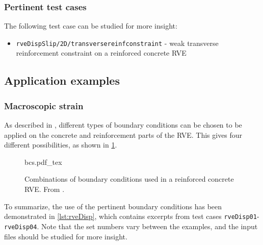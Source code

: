 \documentclass[11pt]{article}
\begin{document}
\subsubsection{Pertinent test cases}
The following test case can be studied for more insight:
\begin{itemize}
    \item \texttt{rveDispSlip/2D/transversereinfconstraint} - weak transverse reinforcement constraint on a reinforced concrete RVE
\end{itemize}

\subsection{Application examples}
\label{sec:bc_applications}

\subsubsection{Macroscopic strain}

As described in \cite{PaperA}, different types of boundary conditions can be chosen to be applied on the concrete and reinforcement parts of the RVE. 
This gives four different possibilities, as shown in \cref{fig:bc_combs}.

\begin{figure}[H]
    \centering
    \def\svgwidth{0.75\textwidth}
    {bcs.pdf_tex}
    \caption{Combinations of boundary conditions used in a reinforced concrete RVE. From \cite{PaperA}.}
    \label{fig:bc_combs}
\end{figure}

\noindent To summarize, the use of the pertinent boundary conditions has been demonstrated in \cref{lst:rveDisp}, which contains excerpts from test cases \texttt{rveDisp01}-\texttt{rveDisp04}. Note that the set numbers vary between the examples, and the input files should be studied for more insight.
\end{document}

